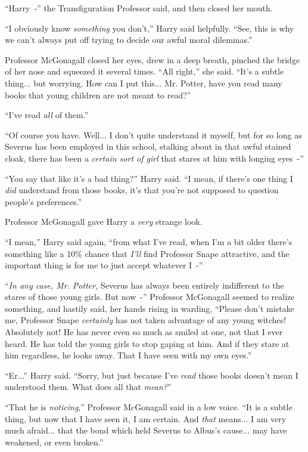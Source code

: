 ``Harry~-'' the Transfiguration Professor said, and then closed her mouth.

``I obviously know \emph{something} you don't,'' Harry said helpfully. ``See, this is why we can't always put off trying to decide our awful moral dilemmas.''

Professor McGonagall closed her eyes, drew in a deep breath, pinched the bridge of her nose and squeezed it several times. ``All right,'' she said. ``It's a subtle thing... but worrying. How can I put this... Mr. Potter, have you read many books that young children are not meant to read?''

``I've read \emph{all} of them.''

``Of course you have. Well... I don't quite understand it myself, but for so long as Severus has been employed in this school, stalking about in that awful stained cloak, there has been a \emph{certain sort of girl} that stares at him with longing eyes~-''

``You say that like it's a bad thing?'' Harry said. ``I mean, if there's one thing I \emph{did} understand from those books, it's that you're not supposed to question people's preferences.''

Professor McGonagall gave Harry a \emph{very} strange look.

``I mean,'' Harry said again, ``from what I've read, when I'm a bit older there's something like a 10\% chance that \emph{I'll} find Professor Snape attractive, and the important thing is for me to just accept whatever I~-''

``\emph{In any case, Mr. Potter,} Severus has always been entirely indifferent to the stares of those young girls. But now~-'' Professor McGonagall seemed to realize something, and hastily said, her hands rising in warding, ``Please don't mistake me, Professor Snape \emph{certainly} has not taken advantage of any young witches! Absolutely not! He has never even so much as smiled at one, not that I ever heard. He has told the young girls to stop gaping at him. And if they stare at him regardless, he looks away. That I have seen with my own eyes.''

``Er...'' Harry said. ``Sorry, but just because I've \emph{read} those books doesn't mean I understood them. What does all that \emph{mean?}''

``That he is \emph{noticing},'' Professor McGonagall said in a low voice. ``It is a subtle thing, but now that I have seen it, I am certain. And \emph{that} means... I am very much afraid... that the bond which held Severus to Albus's cause... may have weakened, or even broken.''

